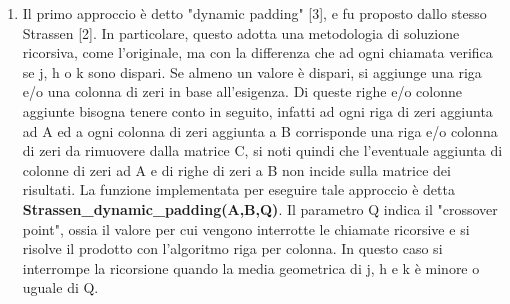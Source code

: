 \documentclass[10pt,a4paper,twoside]{tau-book}
\begin{document}
\begin{enumerate}
    
\item Il primo approccio è detto "dynamic padding" [3], e fu proposto dallo stesso Strassen [2]. In particolare, questo adotta una metodologia di soluzione ricorsiva, come l'originale, ma con la differenza che ad ogni chiamata verifica se j, h o k sono dispari. Se almeno un valore è dispari, si aggiunge una riga e/o una colonna di zeri in base all'esigenza. Di queste righe e/o colonne aggiunte bisogna tenere conto in seguito, infatti ad ogni riga di zeri aggiunta ad A ed a ogni colonna di zeri aggiunta a B corrisponde una riga e/o colonna di zeri da rimuovere dalla matrice C, si noti quindi che l'eventuale aggiunta di colonne di zeri ad A e di righe di zeri a B non incide sulla matrice dei risultati. La funzione implementata per eseguire tale approccio è detta \textbf{Strassen\_dynamic\_padding(A,B,Q)}. Il parametro Q indica il "crossover point", ossia il valore per cui vengono interrotte le chiamate ricorsive e si risolve il prodotto con l'algoritmo riga per colonna. In questo caso si interrompe la ricorsione quando la media geometrica di j, h e k è minore o uguale di Q.


\end{enumerate}
\end{document}
